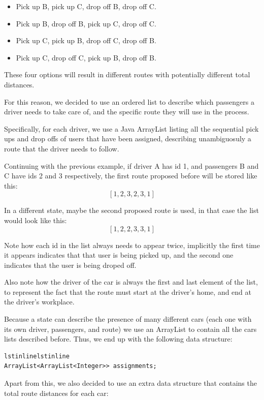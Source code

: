 \documentclass[12]{article}
\begin{document}
\begin{itemize}
	\item Pick up B, pick up C, drop off B, drop off C.
	\item Pick up B, drop off B, pick up C, drop off C.
    \item Pick up C, pick up B, drop off C, drop off B.
    \item Pick up C, drop off C, pick up B, drop off B.
\end{itemize}

These four options will result in different routes with potentially different total distances.

For this reason, we decided to use an ordered list to describe which passengers a driver needs to take care of, and the specific route they will use in the process.

Specifically, for each driver, we use a Java ArrayList listing all the sequential pick ups and drop offs of users that have been assigned, describing unambiguosuly a route that the driver needs to follow.

Continuing with the previous example, if driver A has id 1, and passengers B and C have ids 2 and 3 respectively, the first route proposed before will be stored like this: $$[1, 2, 3, 2, 3, 1]$$

In a different state, maybe the second proposed route is used, in that case the list would look like this: $$[1, 2, 2, 3, 3, 1]$$

Note how each id in the list always needs to appear twice, implicitly the first time it appears indicates that that user is being picked up, and the second one indicates that the user is being droped off.

Also note how the driver of the car is always the first and last element of the list, to represent the fact that the route must start at the driver's home, and end at the driver's workplace.

Because a state can describe the presence of many different cars (each one with its own driver, passengers, and route) we use an ArrayList to contain all the cars lists described before. Thus, we end up with the following data structure:

\begin{lstlisting}lstinlinelstinline
ArrayList<ArrayList<Integer>> assignments;
\end{lstlisting}

Apart from this, we also decided to use an extra data structure that contains the total route distances for each car:
\end{document}
